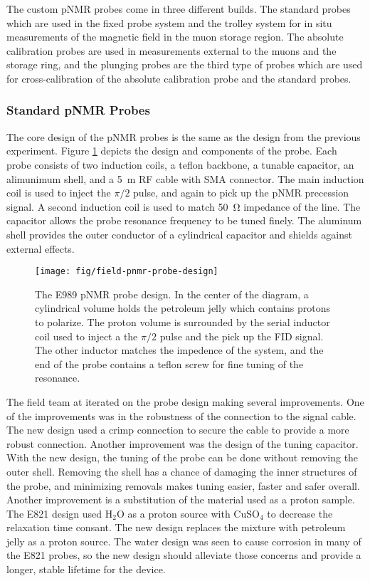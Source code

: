 The custom pNMR probes come in three different builds.  The standard probes which are used in the fixed probe system and the trolley system for in situ measurements of the magnetic field in the muon storage region.  The absolute calibration probes are used in measurements external to the muons and the storage ring, and the plunging probes are the third type of probes which are used for cross-calibration of the absolute calibration probe and the standard probes.

\subsubsection{Standard pNMR Probes}

The core design of the pNMR probes is the same as the design from the previous experiment. Figure \ref{fig:field-pnmr-probe-design} depicts the design and components of the probe.  Each probe consists of two induction coils, a teflon backbone, a tunable capacitor, an alimunimum shell, and a \SI{5}{\meter} RF cable with SMA connector.  The main induction coil is used to inject the $\pi/2$ pulse, and again to pick up the pNMR precession signal.  A second induction coil is used to match \SI{50}{\ohm} impedance of the line.  The capacitor allows the probe resonance frequency to be tuned finely.  The aluminum shell provides the outer conductor of a cylindrical capacitor and shields against external effects.

\begin{figure}
\texttt{[image: fig/field-pnmr-probe-design]}
\caption{
    The E989 pNMR probe design.  In the center of the diagram, a cylindrical volume holds the petroleum jelly which contains protons to polarize.  The proton volume is surrounded by the serial inductor coil used to inject a the $\pi/2$ pulse and the pick up the FID signal.  The other inductor matches the impedence of the system, and the end of the probe contains a teflon screw for fine tuning of the resonance.
    \label{fig:field-pnmr-probe-design}
}
\end{figure}

The field team at \uw iterated on the probe design making several improvements.  One of the improvements was in the robustness of the connection to the signal cable.  The new design used a crimp connection to secure the cable to provide a more robust connection.  Another improvement was the design of the tuning capacitor.  With the new design, the tuning of the probe can be done without removing the outer shell.  Removing the shell has a chance of damaging the inner structures of the probe, and minimizing removals makes tuning easier, faster and safer overall.  Another improvement is a substitution of the material used as a proton sample.  The E821 design used $\mathrm{H_2O}$ as a proton source with $\mathrm{CuSO_4}$ to decrease the relaxation time consant.  The new design replaces the mixture with petroleum jelly as a proton source.  The water design was seen to cause corrosion in many of the E821 probes, so the new design should alleviate those concerns and provide a longer, stable lifetime for the device.

